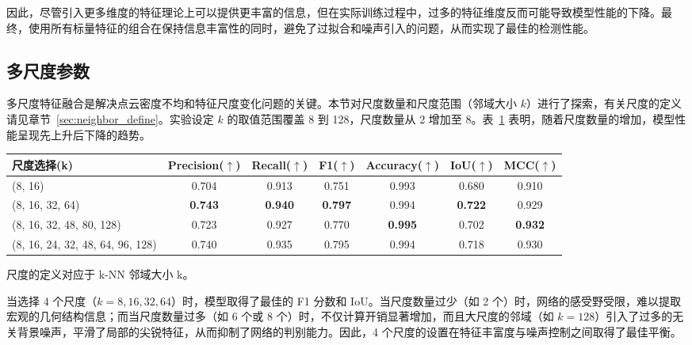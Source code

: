 因此，尽管引入更多维度的特征理论上可以提供更丰富的信息，但在实际训练过程中，过多的特征维度反而可能导致模型性能的下降。最终，使用所有标量特征的组合在保持信息丰富性的同时，避免了过拟合和噪声引入的问题，从而实现了最佳的检测性能。


\subsection{多尺度参数}

多尺度特征融合是解决点云密度不均和特征尺度变化问题的关键。本节对尺度数量和尺度范围（邻域大小 $k$）进行了探索，有关尺度的定义请见章节~\ref{sec:neighbor_define}。实验设定 $k$ 的取值范围覆盖 8 到 128，尺度数量从 2 增加至 8。表~\ref{tab:ablation_scale} 表明，随着尺度数量的增加，模型性能呈现先上升后下降的趋势。

\begin{table}[ht]
    \centering
    \small
    \setlength{\tabcolsep}{4pt}
    \label{tab:ablation_scale}
    \begin{threeparttable}
    \begin{tabular}{lcccccc}
            \toprule
            尺度选择(k) & Precision($\uparrow$) & Recall($\uparrow$)  & F1($\uparrow$) & Accuracy($\uparrow$) & IoU($\uparrow$) & MCC($\uparrow$) \\
            \midrule
            (8, 16) & 0.704 & 0.913 & 0.751 & 0.993 & 0.680 & 0.910 \\
            (8, 16, 32, 64) & \textbf{0.743} & \textbf{0.940} & \textbf{0.797} & 0.994 & \textbf{0.722} & 0.929 \\
            (8, 16, 32, 48, 80, 128) & 0.723 & 0.927 & 0.770 & \textbf{0.995} & 0.702 & \textbf{0.932} \\
            (8, 16, 24, 32, 48, 64, 96, 128) & 0.740 & 0.935 & 0.795 & 0.994 & 0.718 & 0.930 \\
            \bottomrule
        \end{tabular}
        \begin{tablenotes}
            \footnotesize
             \item 尺度的定义对应于 k-NN 邻域大小 k。
        \end{tablenotes}
        \end{threeparttable}
       
\end{table}

当选择 4 个尺度（$k=8, 16, 32, 64$）时，模型取得了最佳的 F1 分数和 IoU。当尺度数量过少（如 2 个）时，网络的感受野受限，难以提取宏观的几何结构信息；而当尺度数量过多（如 6 个或 8 个）时，不仅计算开销显著增加，而且大尺度的邻域（如 $k=128$）引入了过多的无关背景噪声，平滑了局部的尖锐特征，从而抑制了网络的判别能力。因此，4 个尺度的设置在特征丰富度与噪声控制之间取得了最佳平衡。


